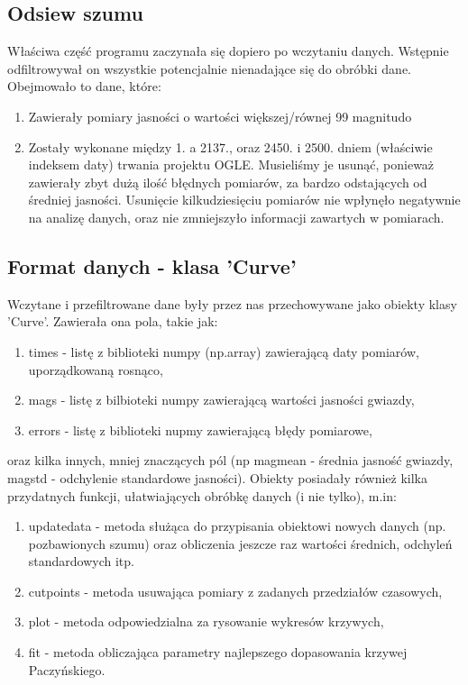 \documentclass[a4paper,11pt]{article}
\newcommand{\ak}{\hspace{0.7 cm}}
\begin{document}
\subsection{Odsiew szumu}
\ak Właściwa część programu zaczynała się dopiero po wczytaniu danych. Wstępnie odfiltrowywał on wszystkie potencjalnie nienadające się do obróbki dane. Obejmowało to dane, które:
\begin{enumerate}
\item Zawierały pomiary jasności o wartości większej/równej 99 magnitudo 
\item Zostały wykonane między 1. a 2137., oraz  2450. i 2500. dniem (właściwie indeksem daty) trwania projektu OGLE. Musieliśmy je usunąć, ponieważ zawierały zbyt dużą ilość błędnych pomiarów, za bardzo odstających od średniej jasności. Usunięcie kilkudziesięciu pomiarów nie wpłynęło negatywnie na analizę danych, oraz nie zmniejszyło informacji zawartych w pomiarach. 
\end{enumerate}

\subsection{Format danych - klasa 'Curve'}
\ak Wczytane i przefiltrowane dane były przez nas przechowywane jako obiekty klasy 'Curve'. Zawierała ona pola, takie jak:
\begin{enumerate}
	\item times - listę z biblioteki numpy (np.array) zawierającą daty pomiarów, uporządkowaną rosnąco,
	\item mags - listę z bilbioteki numpy zawierającą wartości jasności gwiazdy,
	\item errors - listę z biblioteki nupmy zawierającą błędy pomiarowe,
\end{enumerate}
		oraz kilka innych, mniej znaczących pól (np mag\textunderscore mean - średnia jasność gwiazdy, mag\textunderscore std - odchylenie standardowe jasności).
Obiekty posiadały również kilka przydatnych funkcji, ułatwiających obróbkę danych (i nie tylko), m.in:
\begin{enumerate}
	\item update\textunderscore data - metoda służąca do przypisania obiektowi nowych danych (np. pozbawionych szumu) oraz obliczenia jeszcze raz wartości średnich, odchyleń standardowych itp.
	\item cut\textunderscore points - metoda usuwająca pomiary z zadanych przedziałów czasowych,
	\item plot - metoda odpowiedzialna za rysowanie wykresów krzywych,
	\item fit - metoda obliczająca parametry najlepszego dopasowania krzywej Paczyńskiego.

\end{enumerate}
\end{document}
